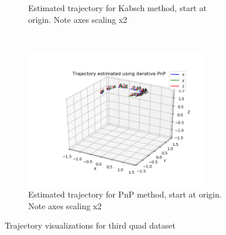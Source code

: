 \documentclass[12pt,a4paper]{article}
\begin{document}
\begin{figure}[p]
\begin{subfigure}[t]{0.5\textwidth}
  \caption{Estimated trajectory for Kabsch method, start at origin. Note axes scaling x2}
  \end{subfigure}%
  ~
  \begin{subfigure}[t]{0.5\textwidth}
  \centering
    \includegraphics[width=80mm]{../quad/basic-reg-saves/rtrj_pnp_40.png}
  \caption{Estimated trajectory for PnP method, start at origin. Note axes scaling x2}
  \end{subfigure}
  \caption{Trajectory visualizations for third quad dataset}
  \label{f: quad3 trj}
\end{figure}
\end{document}
